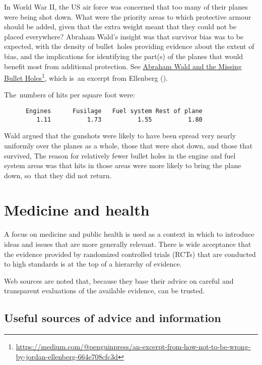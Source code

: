 \documentclass[
  10ptls,
  b5paper]{book}
\begin{document}
In World War II, the US air force was concerned that too many
of their planes were being shot down. What were the priority
areas to which protective armour should be added, given that
the extra weight meant that they could not be placed everywhere?
Abraham Wald's insight was that survivor bias was to be
expected, with the density of bullet~holes providing evidence
about the extent of bias, and the implications for identifying
the part(s) of the planes that would benefit most from
additional protection. See \href{https://medium.com/@penguinpress/an-excerpt-from-how-not-to-be-wrong-by-jordan-ellenberg-664e708cfc3d}{Abraham Wald and the Missing Bullet Holes}\footnote{\url{https://medium.com/@penguinpress/an-excerpt-from-how-not-to-be-wrong-by-jordan-ellenberg-664e708cfc3d}},
which is~an excerpt from Ellenberg ().

The~numbers of hits per square foot were:

\begin{verbatim}
      Engines      Fusilage   Fuel system Rest of plane 
         1.11          1.73          1.55          1.80 
\end{verbatim}

Wald argued that the gunshots were likely to have been spread
very nearly uniformly over the planes as a whole, those that
were shot down, and those that survived, The reason for relatively
fewer bullet holes in the engine and fuel system areas was that
hits in those areas were more likely to bring the plane down,
so~that they did not return.

\chapter{Medicine and health}\label{medicine-and-health}

A focus on medicine and public health is used as a context in which to introduce ideas and issues that are more generally relevant. There is wide acceptance that the evidence provided by randomized controlled trials (RCTs) that are conducted to high standards is at the top of a hierarchy of evidence.

Web sources are noted that, because they base their advice on careful and transparent evaluations of the available evidence, can be trusted.

\section{Useful sources of advice and information}\label{useful-sources-of-advice-and-information}
\end{document}
